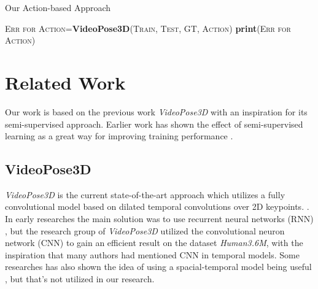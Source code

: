 \documentclass[10pt,twocolumn,letterpaper]{article}
\begin{document}
\begin{algorithm}
  \caption{Our Action-based Approach}
  \SetAlgoLined
  
  
  	{
 		\textsc{Err for Action}=\textbf{VideoPose3D}(\textsc{Train, Test, GT, Action})\;
  		\textbf{print}(\textsc{Err for Action})\;
  		
  	}
  
 \;
\end{algorithm}


\section{Related Work}

Our work is based on the previous work \textit{VideoPose3D} with an inspiration for its
semi-supervised approach. Earlier work has shown the effect of semi-supervised learning
as a great way for improving training performance \cite{zhu2009introduction}. 

\subsection{VideoPose3D}


\textit{VideoPose3D} is the current state-of-the-art approach which utilizes a fully 
convolutional model based on dilated temporal convolutions over 2D keypoints. 
\cite{pavlakos2017coarse,pavllo20193d}. In early researches the main solution
was to use recurrent neural networks (RNN) \cite{lee2018propagating}, but the research
group of \textit{VideoPose3D} utilized the convolutional neuron network (CNN) to gain
an efficient result on the dataset \textit{Human3.6M}, with the inspiration that
many authors had mentioned CNN in temporal models. Some researches has also shown the 
idea of using a spacial-temporal model being useful \cite{7298734}, but that's not utilized in our 
research.
\end{document}
